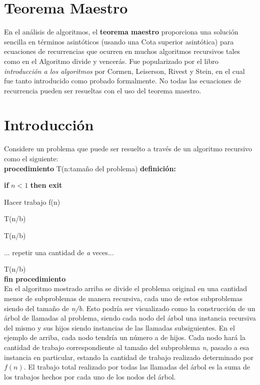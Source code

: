 \documentclass[12pt, letterpaper]{article} %
\author{Julieth-Estefania Gutierrez-Lopera}
\date{Abril, 2020}
\begin{document}
\maketitle
\section*{Teorema Maestro} \hline
En el análisis de algoritmos, el \textbf{teorema maestro} proporciona una solución sencilla en términos asintóticos (usando una Cota superior asintótica) para ecuaciones de recurrencias que ocurren en muchos algoritmos recursivos tales como en el Algoritmo divide y vencerás. Fue popularizado por el libro \textit{introducción a los algoritmos} por Cormen, Leiserson, Rivest y Stein, en el cual fue tanto introducido como probado formalmente. No todas las ecuaciones de recurrencia pueden ser resueltas con el uso del teorema maestro.

\tableofcontents

\section{Introducción} \hline
Considere un problema que puede ser resuelto a través de un algoritmo recursivo como el siguiente:\\

\vspace{1mm}
\textbf{procedimiento} T(n:tamaño del problema) \textbf{definición:}
    \par\hspace{4mm}\textbf{if} $n<1$ \textbf{then exit}
    \par\hspace{4mm} Hacer trabajo f(n)
    \vspace{3mm}
    \par\hspace{4mm} T(n/b)
    \par\hspace{4mm} T(n/b)
    \par\hspace{4mm} ... repetir una cantidad de \textit{a} veces...
    \par\hspace{4mm} T(n/b)\\
    \textbf{fin procedimiento}\\

En el algoritmo mostrado arriba se divide el problema original en una cantidad menor de subproblemas de manera recursiva, cada uno de estos subproblemas siendo del tamaño de \textit{n/b}. Esto podría ser visualizado como la construcción de un árbol de llamadas al problema, siendo cada nodo del árbol una instancia recursiva del mismo y sus hijos siendo instancias de las llamadas subsiguientes. En el ejemplo de arriba, cada nodo tendría un número a de hijos. Cada nodo hará la cantidad de trabajo correspondiente al tamaño del subproblema \textit{n}, pasado a esa instancia en particular, estando la cantidad de trabajo realizado determinado por $f(n)$. El trabajo total realizado por todas las llamadas del árbol es la suma de los trabajos hechos por cada uno de los nodos del árbol. \\
\vspace{1mm}
\end{document}
